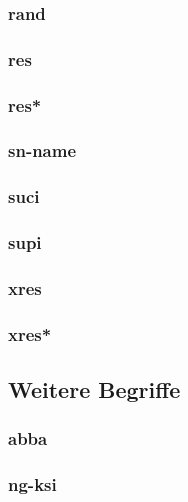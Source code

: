 \subsubsection{\gls{rand}}

\subsubsection{\gls{res}}

\subsubsection{\gls{res*}}

\subsubsection{\gls{sn-name}}

\subsubsection{\gls{suci}}

\subsubsection{\gls{supi}}

\subsubsection{\gls{xres}}

\subsubsection{\gls{xres*}}




\subsection{Weitere Begriffe}

\subsubsection{\gls{abba}}

\subsubsection{\gls{ng-ksi}}
















